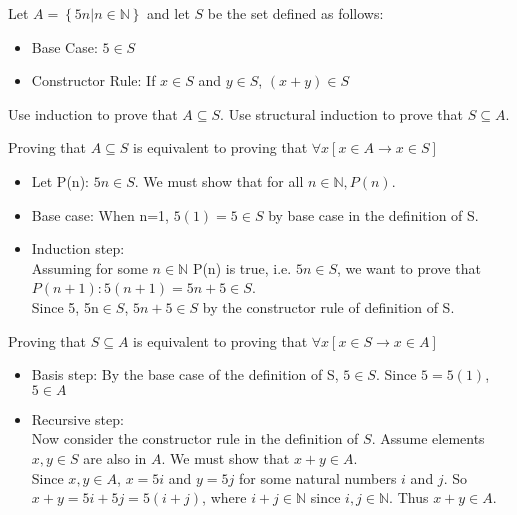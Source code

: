\documentclass[solution, letterpaper]{cs20}
\begin{document}
Let $A = \left\{ {5n|n\in\mathbb{N}}\right\}$ and let $S$ be the set defined as follows:
\begin{itemize}
\item Base Case: $5 \in S$
\item Constructor Rule: If $x\in S$ and $y\in S$, $(x+y) \in S$ 
\end{itemize}
\subproblem Use induction to prove that $A\subseteq S $.
\subproblem Use structural induction to prove that $S\subseteq A$.

\begin{solution}
\subsolution Proving that $A\subseteq S$ is equivalent to proving that $\forall x[x\in A\rightarrow x\in S]$
\begin{itemize}
\item Let P(n): $5n\in S$. We must show that for all $n\in\mathbb{N}, P(n)$.
\item Base case: When n=1, $5(1)=5\in S$ by base case in the definition of S.
\item Induction step: \\
Assuming for some $n\in\mathbb{N}$ P(n) is true, i.e. $5n\in S$, we want to prove that $P(n+1): 5(n+1)=5n+5\in S$.\\
Since 5, 5n$\in S$, $5n+5\in S$ by the constructor rule of definition of S.
\end{itemize}
\subsolution Proving that $S\subseteq A$ is equivalent to proving that $\forall x[x\in S\rightarrow x\in A]$
\begin{itemize}
\item Basis step: By the base case of the definition of S, $5\in S$. Since $5=5(1)$, $5\in A$
\item Recursive step: \\
Now consider the constructor rule in the definition of $S$. Assume elements $x,y\in S$ are also in $A$. We must show that $x+y\in A$.\\
Since $x,y\in A$, $x=5i$ and $y=5j$ for some natural numbers $i$ and $j$. So $x+y=5i+5j=5(i+j)$, where $i+j\in\mathbb{N}$ since $i,j\in\mathbb{N}$. Thus $x+y\in A.$
\end{itemize}
\end{solution}
\end{document}
